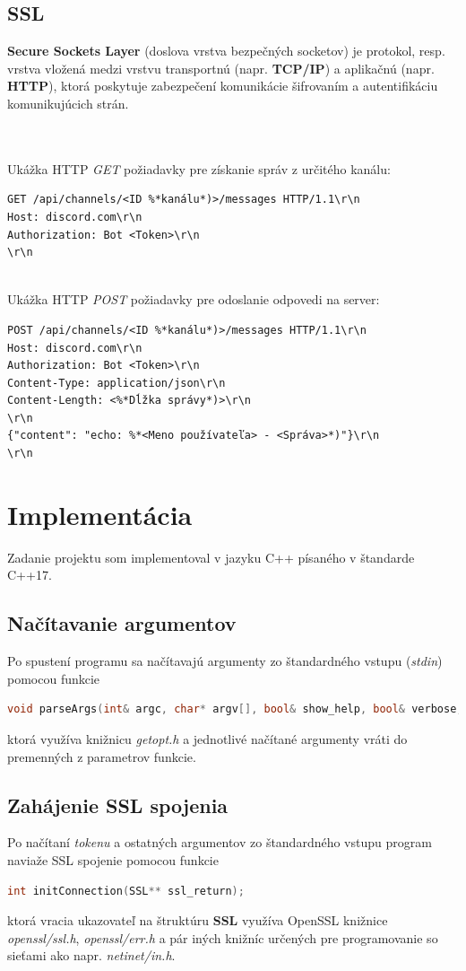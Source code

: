 \documentclass[a4paper,12pt]{article}
\begin{document}
\subsection{SSL}
\textbf{Secure Sockets Layer} (doslova vrstva bezpečných socketov) je protokol, resp. vrstva vložená medzi vrstvu transportnú (napr. \textbf{TCP/IP}) a aplikačnú (napr. \textbf{HTTP}), ktorá poskytuje zabezpečení komunikácie šifrovaním a autentifikáciu komunikujúcich strán. \cite{wiki_ssl}

\leavevmode\\\\
Ukážka HTTP \textit{GET} požiadavky pre získanie správ z určitého kanálu:
\begin{lstlisting}
GET /api/channels/<ID %*kanálu*)>/messages HTTP/1.1\r\n
Host: discord.com\r\n
Authorization: Bot <Token>\r\n
\r\n
\end{lstlisting}
\leavevmode\\
Ukážka HTTP \textit{POST} požiadavky pre odoslanie odpovedi na server:
\begin{lstlisting}
POST /api/channels/<ID %*kanálu*)>/messages HTTP/1.1\r\n
Host: discord.com\r\n
Authorization: Bot <Token>\r\n
Content-Type: application/json\r\n
Content-Length: <%*Dĺžka správy*)>\r\n
\r\n
{"content": "echo: %*<Meno používateľa> - <Správa>*)"}\r\n
\r\n
\end{lstlisting}


\newpage
\section{Implementácia}
Zadanie projektu som implementoval v jazyku C++ písaného v štandarde C++17. 

\subsection{Načítavanie argumentov}
Po spustení programu sa načítavajú argumenty zo štandardného vstupu (\textit{stdin}) pomocou funkcie
\begin{lstlisting}[language=C++]
void parseArgs(int& argc, char* argv[], bool& show_help, bool& verbose, std::string& token);
\end{lstlisting}
ktorá využíva knižnicu \textit{getopt.h} a jednotlivé načítané argumenty vráti do premenných z parametrov funkcie.

\subsection{Zahájenie SSL spojenia}
Po načítaní \textit{tokenu} a ostatných argumentov zo štandardného vstupu program naviaže SSL spojenie pomocou funkcie 
\begin{lstlisting}[language=C++]
int initConnection(SSL** ssl_return);
\end{lstlisting}
ktorá vracia ukazovateľ na štruktúru \textbf{SSL} využíva OpenSSL knižnice \textit{openssl/ssl.h}, \textit{openssl/err.h} a pár iných knižníc určených pre programovanie so sieťami ako napr. \textit{netinet/in.h}.
\cite{stackoverflow}
\end{document}
